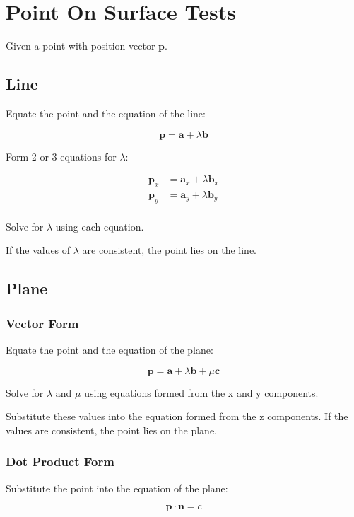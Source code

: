 \documentclass[a4paper,11pt]{report}
\newcommand{\bb}{\boldsymbol}
\begin{document}
\section{Point On Surface Tests}

Given a point with position vector $\bb{p}$.

\subsection{Line}

Equate the point and the equation of the line:

$$
\bb{p} = \bb{a} + \lambda \bb{b}
$$

Form 2 or 3 equations for $\lambda$:

$$
\begin{aligned}
\bb{p}_x & = \bb{a}_x + \lambda \bb{b}_x \\
\bb{p}_y & = \bb{a}_y + \lambda \bb{b}_y \\
\end{aligned}
$$

Solve for $\lambda$ using each equation.

If the values of $\lambda$ are consistent, the point lies on the line.

\subsection{Plane}

\subsubsection{Vector Form}

Equate the point and the equation of the plane:

$$
\bb{p} = \bb{a} + \lambda \bb{b} + \mu \bb{c}
$$

Solve for $\lambda$ and $\mu$ using equations formed from the x and y
components.

Substitute these values into the equation formed from the z components. If the
values are consistent, the point lies on the plane.

\subsubsection{Dot Product Form}

Substitute the point into the equation of the plane:

$$
\bb{p} \cdot \bb{n} = c
$$
\end{document}
